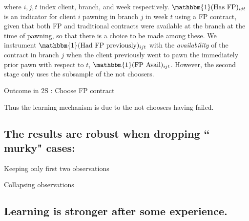 \documentclass[oneside,11pt]{article}
\begin{document}
where $i,j,t$ index client, branch, and week respectively. $\mathbbm{1}(\text{Has FP})_{ijt}$ is an indicator for client $i$ pawning in branch $j$ in week $t$ using a FP contract, given that both FP and traditional contracts were available at the branch at the time of pawning, so that there is a choice to be made among these. We instrument $\mathbbm{1}(\text{Had FP previously})_{ijt}$ with the \textit{availability} of the contract in branch $j$  when the client previously went to pawn the immediately prior pawn with respect to $t$, $\mathbbm{1}(\text{FP Avail})_{ijt}$. However, the second stage only uses the subsample of the not choosers. 



\begin{table}[H]
\caption{Outcome in 2S : Choose FP contract}
\label{iv_pf}
\begin{center}
\scriptsize{}
\end{center}
 \scriptsize

\end{table}

Thus the learning mechanism is due to the not choosers having failed. 

\newpage

\subsection*{The results are robust when dropping `` murky" cases:}


\begin{table}[H]
\caption{Keeping only first two observations}
\begin{center}
\scriptsize{}
\end{center}
 \scriptsize

\end{table}


\begin{table}[H]
\caption{Collapsing observations}
\begin{center}
\scriptsize{}
\end{center}
 \scriptsize

\end{table}

\subsection*{Learning is stronger after some experience.}
\end{document}
